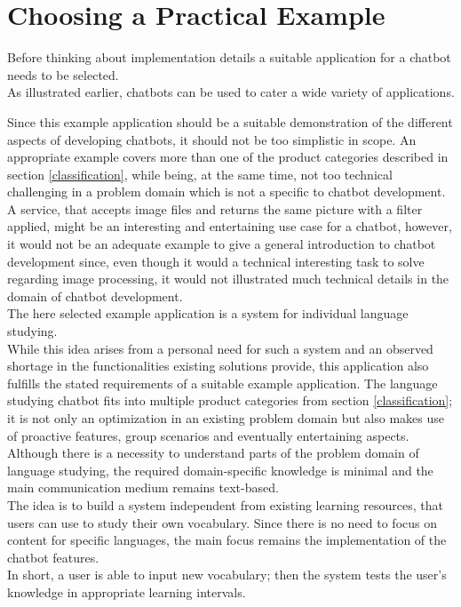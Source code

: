 \section{Choosing a Practical Example}

Before thinking about implementation details a suitable application for a chatbot needs to be selected.
\\
As illustrated earlier, chatbots can be used to cater a wide variety of applications.

Since this example application should be a suitable demonstration of the different aspects of developing chatbots,
it should not be too simplistic in scope.
An appropriate example covers more than one of the product categories described in section \ref{classification},
while being, at the same time, not too technical challenging in a problem domain which is not a specific to chatbot development.
\\
A service, that accepts image files and returns the same picture with a filter applied, might be an interesting and entertaining use case for a chatbot, however, it would not be an adequate example to give a general introduction to chatbot development since, even though it would a technical interesting task to solve regarding image processing, it would not illustrated much technical details in the domain of chatbot development.
\\

The here selected example application is a system for individual language studying.
\\
While this idea arises from a personal need for such a system and an observed shortage in the functionalities existing solutions provide,
this application also fulfills the stated requirements of a suitable example application.
The language studying chatbot fits into multiple product categories from section \ref{classification}; it is not only an optimization in an existing problem domain but also makes use of proactive features, group scenarios and eventually entertaining aspects.
\\
Although there is a necessity to understand parts of the problem domain of language studying,
the required domain-specific knowledge is minimal and the main communication medium remains text-based.
\\

The idea is to build a system independent from existing learning resources, that users can use to study their own vocabulary.
Since there is no need to focus on content for specific languages, the main focus remains the implementation of the chatbot features.
\\
In short, a user is able to input new vocabulary; then the system tests the user's knowledge in appropriate learning intervals.
